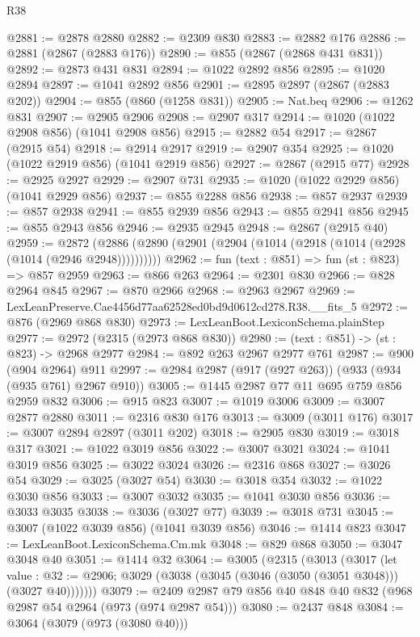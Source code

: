 \begin{lexlean}{R38}
\begin{coremodule}
@2881 := @2878 @2880
@2882 := @2309 @830
@2883 := @2882 @176
@2886 := @2881 (@2867 (@2883 @176))
@2890 := @855 (@2867 (@2868 @431 @831))
@2892 := @2873 @431 @831
@2894 := @1022 @2892 @856
@2895 := @1020 @2894
@2897 := @1041 @2892 @856
@2901 := @2895 @2897 (@2867 (@2883 @202))
@2904 := @855 (@860 (@1258 @831))
@2905 := Nat.beq
@2906 := @1262 @831
@2907 := @2905 @2906
@2908 := @2907 @317
@2914 := @1020 (@1022 @2908 @856) (@1041 @2908 @856)
@2915 := @2882 @54
@2917 := @2867 (@2915 @54)
@2918 := @2914 @2917
@2919 := @2907 @354
@2925 := @1020 (@1022 @2919 @856) (@1041 @2919 @856)
@2927 := @2867 (@2915 @77)
@2928 := @2925 @2927
@2929 := @2907 @731
@2935 := @1020 (@1022 @2929 @856) (@1041 @2929 @856)
@2937 := @855 @2288 @856
@2938 := @857 @2937
@2939 := @857 @2938
@2941 := @855 @2939 @856
@2943 := @855 @2941 @856
@2945 := @855 @2943 @856
@2946 := @2935 @2945
@2948 := @2867 (@2915 @40)
@2959 := @2872 (@2886 (@2890 (@2901 (@2904 (@1014 (@2918 (@1014 (@2928 (@1014 (@2946 @2948))))))))))
@2962 := fun (text : @851) => fun (st : @823) => @857 @2959
@2963 := @866 @263
@2964 := @2301 @830
@2966 := @828 @2964 @845
@2967 := @870 @2966
@2968 := @2963 @2967
@2969 := LexLeanPreserve.Cae4456d77aa62528ed0bd9d0612cd278.R38.__fits_5
@2972 := @876 (@2969 @868 @830)
@2973 := LexLeanBoot.LexiconSchema.plainStep
@2977 := @2972 (@2315 (@2973 @868 @830))
@2980 := (text : @851) -> (st : @823) -> @2968 @2977
@2984 := @892 @263 @2967 @2977 @761
@2987 := @900 (@904 @2964) @911
@2997 := @2984 @2987 (@917 (@927 @263)) (@933 (@934 (@935 @761) @2967 @910))
@3005 := @1445 @2987 @77 @11 @695 @759 @856 @2959 @832
@3006 := @915 @823
@3007 := @1019 @3006
@3009 := @3007 @2877 @2880
@3011 := @2316 @830 @176
@3013 := @3009 (@3011 @176)
@3017 := @3007 @2894 @2897 (@3011 @202)
@3018 := @2905 @830
@3019 := @3018 @317
@3021 := @1022 @3019 @856
@3022 := @3007 @3021
@3024 := @1041 @3019 @856
@3025 := @3022 @3024
@3026 := @2316 @868
@3027 := @3026 @54
@3029 := @3025 (@3027 @54)
@3030 := @3018 @354
@3032 := @1022 @3030 @856
@3033 := @3007 @3032
@3035 := @1041 @3030 @856
@3036 := @3033 @3035
@3038 := @3036 (@3027 @77)
@3039 := @3018 @731
@3045 := @3007 (@1022 @3039 @856) (@1041 @3039 @856)
@3046 := @1414 @823
@3047 := LexLeanBoot.LexiconSchema.Cm.mk
@3048 := @829 @868
@3050 := @3047 @3048 @40
@3051 := @1414 @32
@3064 := @3005
    (@2315
      (@3013
        (@3017
          (let value : @32 := @2906;
          @3029 (@3038 (@3045 (@3046 (@3050 (@3051 @3048))) (@3027 @40)))))))
@3079 := @2409 @2987 @79 @856 @40 @848 @40 @832 (@968 @2987 @54 @2964 (@973 (@974 @2987 @54)))
@3080 := @2437 @848
@3084 := @3064 (@3079 (@973 (@3080 @40)))

\end{coremodule}
\end{lexlean}
